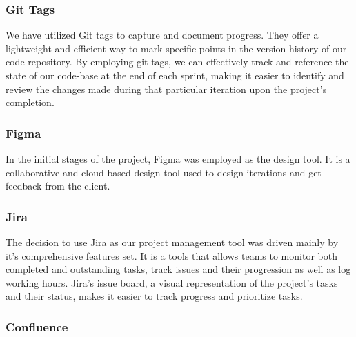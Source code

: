
\subsubsection{Git Tags}

We have utilized Git tags to capture and document progress. They offer a lightweight and efficient way to mark specific points in the version history of our code repository. By employing git tags, we can effectively track and reference the state of our code-base at the end of each sprint, making it easier to identify and review the changes made during that particular iteration upon the project’s completion. 

\subsubsection{Figma}

In the initial stages of the project, Figma was employed as the design tool. It is a collaborative and cloud-based design tool used to design iterations and get feedback from the client. 

\subsubsection{Jira}

The decision to use Jira as our project management tool was driven mainly by it's comprehensive features set. It is a tools that allows teams to monitor both completed and outstanding tasks, track issues and their progression as well as log working hours. \cite{Ricksoft_Jira} Jira's issue board, a visual representation of the project’s tasks and their status, makes it easier to track progress and prioritize tasks. 

\subsubsection{Confluence}

